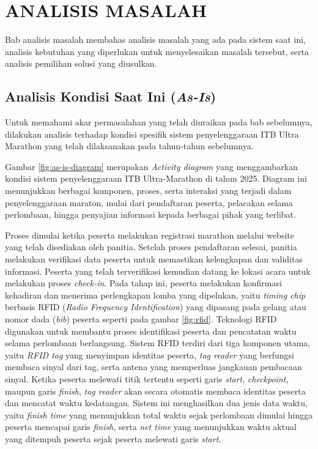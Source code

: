 \cleardoublepage
\chapter{ANALISIS MASALAH}
\label{chap:analisis-masalah}
Bab analisis masalah membahas analisis masalah yang ada pada sistem saat ini, analisis kebutuhan yang diperlukan untuk menyelesaikan masalah tersebut, serta analisis pemilihan solusi yang diusulkan.

\section{Analisis Kondisi Saat Ini (\textit{As-Is})}
Untuk memahami akar permasalahan yang telah diuraikan pada bab sebelumnya, dilakukan analisis terhadap kondisi spesifik sistem penyelenggaraan ITB Ultra Marathon yang telah dilaksanakan pada tahun-tahun sebelumnya.

Gambar \ref{fig:as-is-diagram} merupakan \textit{Activity diagram} yang menggambarkan kondisi sistem penyelenggaraan ITB Ultra-Marathon di tahun 2025. Diagram ini menunjukkan berbagai komponen, proses, serta interaksi yang terjadi dalam penyelenggaraan maraton, mulai dari pendaftaran peserta, pelacakan selama perlombaan, hingga penyajian informasi kepada berbagai pihak yang terlibat.

Proses dimulai ketika peserta melakukan registrasi marathon melalui website yang telah disediakan oleh panitia. Setelah proses pendaftaran selesai, panitia melakukan verifikasi data peserta untuk memastikan kelengkapan dan validitas informasi. Peserta yang telah terverifikasi kemudian datang ke lokasi acara untuk melakukan proses \textit{check-in}. Pada tahap ini, peserta melakukan konfirmasi kehadiran dan menerima perlengkapan lomba yang dipelukan, yaitu \textit{timing chip} berbasis RFID (\textit{Radio Frequency Identification}) yang dipasang pada gelang atau nomor dada (\textit{bib}) peserta seperti pada gambar \ref{fig:rfid}. Teknologi RFID digunakan untuk membantu proses identifikasi peserta dan pencatatan waktu selama perlombaan berlangsung. Sistem RFID terdiri dari tiga komponen utama, yaitu \textit{RFID tag} yang menyimpan identitas peserta, \textit{tag reader} yang berfungsi membaca sinyal dari tag, serta antena yang memperluas jangkauan pembacaan sinyal. Ketika peserta melewati titik tertentu seperti garis \textit{start}, \textit{checkpoint}, maupun garis \textit{finish}, \textit{tag reader} akan secara otomatis membaca identitas peserta dan mencatat waktu kedatangan. Sistem ini menghasilkan dua jenis data waktu, yaitu \textit{finish time} yang menunjukkan total waktu sejak perlombaan dimulai hingga peserta mencapai garis \textit{finish}, serta \textit{net time} yang menunjukkan waktu aktual yang ditempuh peserta sejak peserta melewati garis \textit{start}.

